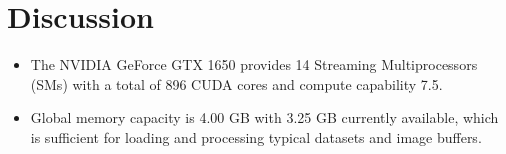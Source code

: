 \documentclass[11pt,a4paper]{article}
\begin{document}
\section{Discussion}
\begin{itemize}
    \item The NVIDIA GeForce GTX 1650 provides 14 Streaming Multiprocessors (SMs) with a total of 896 CUDA cores and compute capability 7.5.
    \item Global memory capacity is 4.00 GB with 3.25 GB currently available, which is sufficient for loading and processing typical datasets and image buffers.
\end{itemize}
\end{document}
